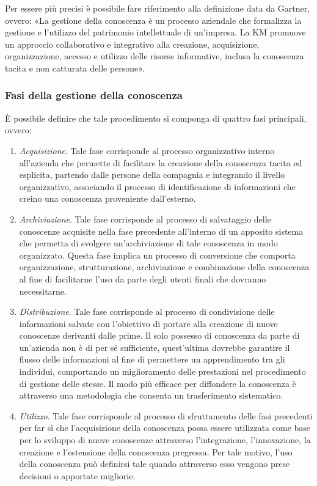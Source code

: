 Per essere più precisi è possibile fare riferimento alla definizione data da Gartner, ovvero: «La gestione della conoscenza è un processo aziendale che formalizza la gestione e l'utilizzo del patrimonio intellettuale di un'impresa. La KM promuove un approccio collaborativo e integrativo alla creazione, acquisizione, organizzazione, accesso e utilizzo delle risorse informative, inclusa la conoscenza tacita e non catturata delle persone».\cite{gartner_knowledge_management}

\subsubsection{Fasi della gestione della conoscenza}

È possibile definire che tale procedimento si componga di quattro fasi principali, ovvero:\cite{knowledge_management_process}
\begin{enumerate}
    \item \textit{Acquisizione}. Tale fase corrisponde al processo organizzativo interno all'azienda che permette di facilitare la creazione della conoscenza tacita ed esplicita, partendo dalle persone della compagnia e integrando il livello organizzativo, associando il processo di identificazione di informazioni che creino una conoscenza proveniente dall'esterno.
    \item \textit{Archiviazione}. Tale fase corrisponde al processo di salvataggio delle conoscenze acquisite nella fase precedente all'interno di un apposito sistema che permetta di svolgere un'archiviazione di tale conoscenza in modo organizzato. Questa fase implica un processo di conversione che comporta organizzazione, strutturazione, archiviazione e combinazione della conoscenza al fine di facilitarne l'uso da parte degli utenti finali che dovranno necessitarne.
    \item \textit{Distribuzione}. Tale fase corrisponde al processo di condivisione delle informazioni salvate con l'obiettivo di portare alla creazione di nuove conoscenze derivanti dalle prime. Il solo possesso di conoscenza da parte di un'azienda non è di per sé sufficiente, quest'ultima dovrebbe garantire il flusso delle informazioni al fine di permettere un apprendimento tra gli individui, comportando un miglioramento delle prestazioni nel procedimento di gestione delle stesse. Il modo più efficace per diffondere la conoscenza è attraverso una metodologia che consenta un trasferimento sistematico.
    \item \textit{Utilizzo}. Tale fase corrisponde al processo di sfruttamento delle fasi precedenti per far sì che l'acquisizione della conoscenza possa essere utilizzata come base per lo sviluppo di nuove conoscenze attraverso l'integrazione, l'innovazione, la creazione e l'estensione della conoscenza pregressa. Per tale motivo, l'uso della conoscenza può definirsi tale quando attraverso esso vengono prese decisioni o apportate migliorie.
\end{enumerate}


